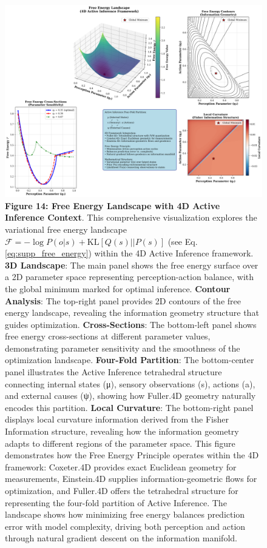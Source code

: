\documentclass[
  10pt,
]{article}
\begin{document}
\begin{figure}
\centering
\includegraphics{../output/figures/figure_14_free_energy_landscape.png}
\caption{\textbf{Figure 14: Free Energy Landscape with 4D Active
Inference Context}. This comprehensive visualization explores the
variational free energy landscape
\(\mathcal{F} = -\log P(o|s) + \text{KL}[Q(s)||P(s)]\) (see Eq.
\eqref{eq:supp_free_energy}) within the 4D Active Inference framework.
\textbf{3D Landscape}: The main panel shows the free energy surface over
a 2D parameter space representing perception-action balance, with the
global minimum marked for optimal inference. \textbf{Contour Analysis}:
The top-right panel provides 2D contours of the free energy landscape,
revealing the information geometry structure that guides optimization.
\textbf{Cross-Sections}: The bottom-left panel shows free energy
cross-sections at different parameter values, demonstrating parameter
sensitivity and the smoothness of the optimization landscape.
\textbf{Four-Fold Partition}: The bottom-center panel illustrates the
Active Inference tetrahedral structure connecting internal states (μ),
sensory observations (s), actions (a), and external causes (ψ), showing
how Fuller.4D geometry naturally encodes this partition. \textbf{Local
Curvature}: The bottom-right panel displays local curvature information
derived from the Fisher Information structure, revealing how the
information geometry adapts to different regions of the parameter space.
This figure demonstrates how the Free Energy Principle operates within
the 4D framework: Coxeter.4D provides exact Euclidean geometry for
measurements, Einstein.4D supplies information-geometric flows for
optimization, and Fuller.4D offers the tetrahedral structure for
representing the four-fold partition of Active Inference. The landscape
shows how minimizing free energy balances prediction error with model
complexity, driving both perception and action through natural gradient
descent on the information manifold.}
\end{figure}
\end{document}
